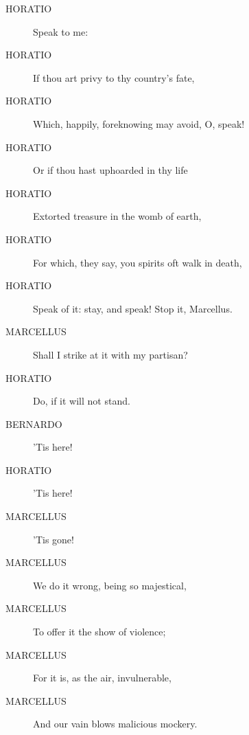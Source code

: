\documentclass{article}
\begin{document}
\begin{description}
\item[HORATIO] Speak to me:
\item[HORATIO] If thou art privy to thy country's fate,
\item[HORATIO] Which, happily, foreknowing may avoid, O, speak!
\item[HORATIO] Or if thou hast uphoarded in thy life
\item[HORATIO] Extorted treasure in the womb of earth,
\item[HORATIO] For which, they say, you spirits oft walk in death,
\item[HORATIO] Speak of it: stay, and speak! Stop it, Marcellus.
\end{description}
          
\begin{description}
            
\item[MARCELLUS] Shall I strike at it with my partisan?
\end{description}
          
\begin{description}
            
\item[HORATIO] Do, if it will not stand.
\end{description}
          
\begin{description}
            
\item[BERNARDO] 'Tis here!
\end{description}
          
\begin{description}
            
\item[HORATIO] 'Tis here!
\end{description}
          
\begin{description}
            
\item[MARCELLUS] 'Tis gone!
\item[MARCELLUS] We do it wrong, being so majestical,
\item[MARCELLUS] To offer it the show of violence;
\item[MARCELLUS] For it is, as the air, invulnerable,
\item[MARCELLUS] And our vain blows malicious mockery.
\end{description}
          
\end{document}
